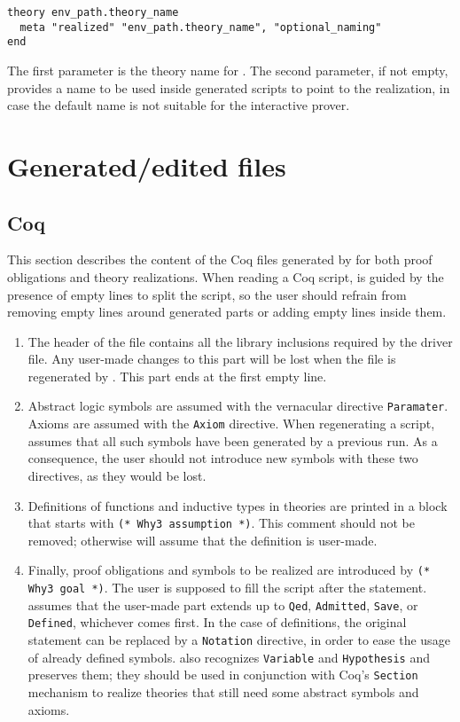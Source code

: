 \begin{verbatim}
theory env_path.theory_name
  meta "realized" "env_path.theory_name", "optional_naming"
end
\end{verbatim}

The first parameter is the theory name for \why. The second
parameter, if not empty, provides a name to be used inside generated
scripts to point to the realization, in case the default name is not
suitable for the interactive prover.

\section{Generated/edited files}

\subsection{Coq}

This section describes the content of the Coq files generated by \why for
both proof obligations and theory realizations. When reading a Coq
script, \why is guided by the presence of empty lines to split the
script, so the user should refrain from removing empty lines around
generated parts or adding empty lines inside them.

\begin{enumerate}
\item	The header of the file contains all the library inclusions
	required by the driver file. Any user-made changes to this part
	will be lost when the file is regenerated by \why. This part ends
	at the first empty line.
\item	Abstract logic symbols are assumed with the vernacular directive
	\verb+Paramater+. Axioms are assumed with the \verb+Axiom+
	directive. When regenerating a script, \why assumes that all such
	symbols have been generated by a previous run. As a consequence,
	the user should not introduce new symbols with these two
	directives, as they would be lost.
\item	Definitions of functions and inductive types in theories are
	printed in a block that starts with \verb+(* Why3 assumption *)+.
	This comment should not be removed; otherwise \why will assume
	that the definition is user-made.
\item	Finally, proof obligations and symbols to be realized are
	introduced by \verb+(* Why3 goal *)+. The user is supposed to
	fill the script after the statement. \why assumes that the
	user-made part extends up to \verb+Qed+, \verb+Admitted+,
	\verb+Save+, or \verb+Defined+, whichever comes first. In the
	case of definitions, the original statement can be replaced by
	a \verb+Notation+ directive, in order to ease the usage of
	already defined symbols. \why also recognizes \verb+Variable+
	and \verb+Hypothesis+ and preserves them; they should be used in
	conjunction with Coq's \verb+Section+ mechanism to realize
	theories that still need some abstract symbols and axioms.
\end{enumerate}

